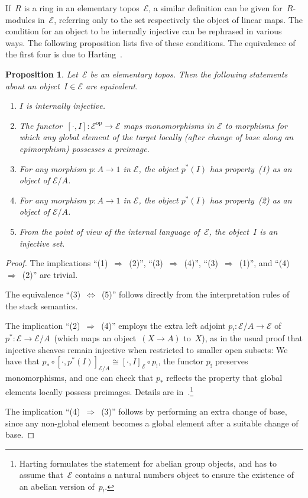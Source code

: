 \documentclass[oneside]{amsart}
\theoremstyle{definition}
\theoremstyle{plain}
\newtheorem{prop}[defn]{Proposition}
\theoremstyle{remark}
\newcommand{\E}{\mathcal{E}}
\newcommand{\op}{\mathrm{op}}
\renewcommand{\_}{\mathpunct{.}\,}
\begin{document}
If~$R$ is a ring in an elementary topos~$\E$, a similar definition can be given
for~$R$-modules in~$\E$, referring only to the set respectively the object of
linear maps. The condition for an object to be internally injective can be
rephrased in various ways. The following proposition lists five of these
conditions. The equivalence of the first four is due to
Harting~\cite{harting:XXX}.

\begin{prop}\label{prop:notions-of-internal-injectivity}
Let~$\E$ be an elementary topos. Then the following statements about an
object~$I \in \E$ are equivalent.
\begin{enumerate}
\item $I$ is internally injective.
\item The functor~$[\cdot, I] : \E^\op \to \E$ maps monomorphisms in $\E$
to morphisms for which any global element of the target locally (after change of
base along an epimorphism) possesses a preimage.
\item For any morphism $p : A \to 1$ in $\E$, the object $p^*(I)$ has property~(1)
as an object of $\E/A$.
\item For any morphism $p : A \to 1$ in $\E$, the object $p^*(I)$ has property~(2)
as an object of $\E/A$.
\item From the point of view of the internal language of~$\E$, the object~$I$
is an injective set.
\end{enumerate}
\end{prop}

\begin{proof}
The implications ``(1)~$\Rightarrow$~(2)'', ``(3)~$\Rightarrow$~(4)'',
``(3)~$\Rightarrow$~(1)'', and ``(4)~$\Rightarrow$~(2)'' are trivial.

The equivalence ``(3)~$\Leftrightarrow$~(5)'' follows directly from the
interpretation rules of the stack semantics.

The implication ``(2)~$\Rightarrow$~(4)'' employs the
extra left adjoint $p_! : \E/A \to \E$ of $p^* : \E
\to \E/A$~(which maps an object~$(X \to A)$ to~$X$), as in the usual proof that
injective sheaves remain injective when
restricted to smaller open subsets: We have that $p_* \circ [\cdot, p^*(I)]_{\E/A}
\cong [\cdot, I]_\E \circ p_!$, the functor $p_!$ preserves monomorphisms, and one
can check that $p_*$ reflects the property that global elements locally possess
preimages. Details are in~\cite[Thm.~1.1]{harting}.\footnote{Harting formulates
the statement for abelian group objects, and has to assume that~$\E$ contains a
natural numbers object to ensure the existence of an abelian version of~$p_!$.}

The implication ``(4)~$\Rightarrow$~(3)'' follows by performing an extra change of
base, since any non-global element becomes a global element after a suitable
change of base.
\end{proof}
\end{document}
